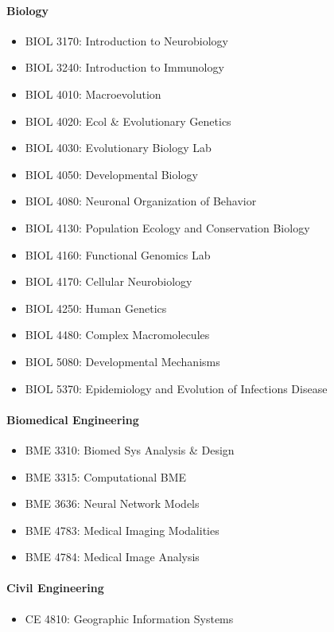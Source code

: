 \documentclass[10pt,letter]{book}
\newenvironment{itemlist}{
\begin{itemize}
\setlength{\itemsep}{0pt}
\setlength{\parskip}{0pt}}
{\end{itemize}}
\begin{document}
\paragraph{Biology}
\begin{itemlist}
\item BIOL 3170: Introduction to Neurobiology
\item BIOL 3240: Introduction to Immunology
\item BIOL 4010: Macroevolution
\item BIOL 4020: Ecol \& Evolutionary Genetics
\item BIOL 4030: Evolutionary Biology Lab
\item BIOL 4050: Developmental Biology
\item BIOL 4080: Neuronal Organization of Behavior
\item BIOL 4130: Population Ecology and Conservation Biology
\item BIOL 4160: Functional Genomics Lab
\item BIOL 4170: Cellular Neurobiology
\item BIOL 4250: Human Genetics
\item BIOL 4480: Complex Macromolecules
\item BIOL 5080: Developmental Mechanisms
\item BIOL 5370: Epidemiology and Evolution of Infections Disease
\end{itemlist}

\paragraph{Biomedical Engineering}
\begin{itemlist}
\item BME 3310: Biomed Sys Analysis \& Design
\item BME 3315: Computational BME
\item BME 3636: Neural Network Models
\item BME 4783: Medical Imaging Modalities
\item BME 4784: Medical Image Analysis
\end{itemlist}

\paragraph{Civil Engineering}
\begin{itemlist}
\item CE 4810: Geographic Information Systems
\end{itemlist}
\end{document}
